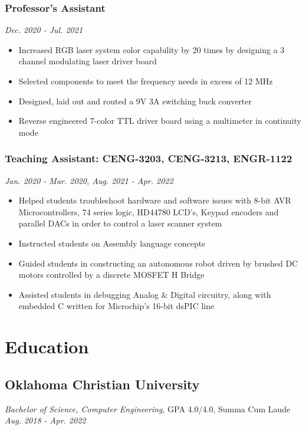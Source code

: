 \documentclass{article}
\begin{document}
\begin{spacing}{.5}
		\subsubsection{\large{Professor's Assistant}} \hfill \small{\textsl{Dec. 2020 - Jul. 2021}}
			\begin{itemize}[label=--,itemsep=-.35ex]
				\item \large{Increased RGB laser system color capability by 20 times by designing a 3 channel modulating laser driver board}
				\item \large{Selected components to meet the frequency needs in excess of 12 MHz}
				\item \large{Designed, laid out and routed a 9V 3A switching buck converter}
				\item \large{Reverse engineered 7-color TTL driver board using a multimeter in continuity mode}
			\end{itemize}
		\subsubsection{\large{Teaching Assistant: CENG-3203, CENG-3213, ENGR-1122}} \hfill \small{\textsl{Jan. 2020 - Mar. 2020, Aug. 2021 - Apr. 2022}}
			\begin{itemize}[label=--,itemsep=-.35ex]
				\item \large{Helped students troubleshoot hardware and software issues with 8-bit AVR Microcontrollers, 74 series logic, HD44780 LCD's, Keypad encoders and parallel DACs in order to control a laser scanner system}
				\item \large{Instructed students on Assembly language concepts}
				\item \large{Guided students in constructing an autonomous robot driven by brushed DC motors controlled by a discrete MOSFET H Bridge}
				\item \large{Assisted students in debugging Analog \& Digital circuitry, along with embedded C written for Microchip's 16-bit dsPIC line}
			\end{itemize}

\section{Education}
	\subsection{Oklahoma Christian University}
		\hspace*{.35cm} \textit{Bachelor of Science, Computer Engineering}, GPA 4.0/4.0, Summa Cum Laude \hfill \small{\textsl{Aug. 2018 - Apr. 2022}}


\end{spacing}
\end{document}
